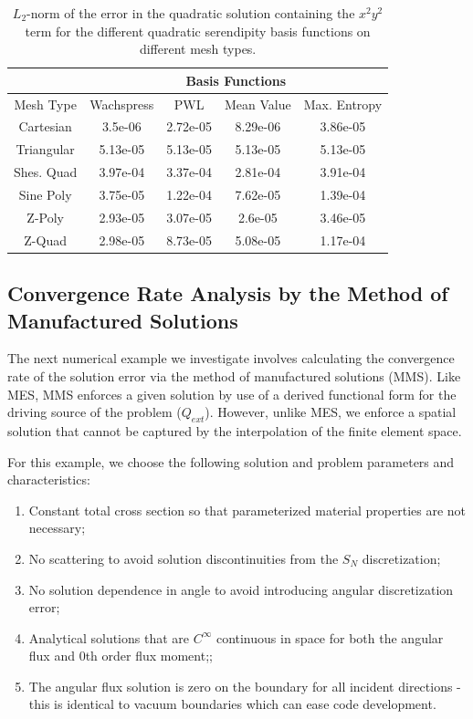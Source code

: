 \begin{table}
\caption{$L_2$-norm of the error in the quadratic solution containing the $x^2y^2$ term for the different quadratic serendipity basis functions on different mesh types.}
\begin{center}
\def\arraystretch{1.6}
\begin{tabular}{|c|c|c|c|c|}
\hline
& \multicolumn{4}{c}{Basis Functions}\vline\\
\hline
Mesh Type & Wachspress & PWL& Mean Value& Max. Entropy \\
\hline
Cartesian&3.5e-06&2.72e-05&8.29e-06&3.86e-05\\
Triangular&5.13e-05&5.13e-05&5.13e-05&5.13e-05\\
Shes. Quad&3.97e-04&3.37e-04&2.81e-04&3.91e-04\\
Sine Poly&3.75e-05&1.22e-04&7.62e-05&1.39e-04\\
Z-Poly&2.93e-05&3.07e-05&2.6e-05&3.46e-05\\
Z-Quad&2.98e-05&8.73e-05&5.08e-05&1.17e-04\\
\hline
\end{tabular}
\end{center}
\label{tab::BF_x2y2_err}
\end{table}



\subsection{Convergence Rate Analysis by the Method of Manufactured Solutions}
\label{sec::BF_Results_MMS}

The next numerical example we investigate involves calculating the convergence rate of the solution error via the method of manufactured solutions (MMS). Like MES, MMS enforces a given solution by use of a derived functional form for the driving source of the problem ($Q_{ext}$). However, unlike MES, we enforce a spatial solution that cannot be captured by the interpolation of the finite element space. 

For this example, we choose the following solution and problem parameters and characteristics:

\begin{enumerate}
	\item Constant total cross section so that parameterized material properties are not necessary;
	\item No scattering to avoid solution discontinuities from the $S_N$ discretization;
	\item No solution dependence in angle to avoid introducing angular discretization error;
	\item Analytical solutions that are $C^{\infty}$ continuous in space for both the angular flux and 0th order flux moment;;
	\item The angular flux solution is zero on the boundary for all incident directions - this is identical to vacuum boundaries which can ease code development.
\end{enumerate}

